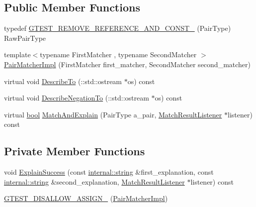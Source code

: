 \subsection*{Public Member Functions}
\begin{DoxyCompactItemize}
\item 
typedef \hyperlink{classtesting_1_1internal_1_1PairMatcherImpl_aa035224a7b73b2af1d1d27226a479241}{G\+T\+E\+S\+T\+\_\+\+R\+E\+M\+O\+V\+E\+\_\+\+R\+E\+F\+E\+R\+E\+N\+C\+E\+\_\+\+A\+N\+D\+\_\+\+C\+O\+N\+S\+T\+\_\+} (Pair\+Type) Raw\+Pair\+Type
\item 
{\footnotesize template$<$typename First\+Matcher , typename Second\+Matcher $>$ }\\\hyperlink{classtesting_1_1internal_1_1PairMatcherImpl_ae2615e785df46255c8695a5972ca510a}{Pair\+Matcher\+Impl} (First\+Matcher first\+\_\+matcher, Second\+Matcher second\+\_\+matcher)
\item 
virtual void \hyperlink{classtesting_1_1internal_1_1PairMatcherImpl_ad4b5139aa8a3cdcc178c9d81b98d95f0}{Describe\+To} (\+::std\+::ostream $\ast$os) const
\item 
virtual void \hyperlink{classtesting_1_1internal_1_1PairMatcherImpl_a41ef8b1ae031cf342a380e2f2fb2a526}{Describe\+Negation\+To} (\+::std\+::ostream $\ast$os) const
\item 
virtual \hyperlink{classbool}{bool} \hyperlink{classtesting_1_1internal_1_1PairMatcherImpl_a1bba47f97cbf50a1f6331d3f7bfd47a1}{Match\+And\+Explain} (Pair\+Type a\+\_\+pair, \hyperlink{classtesting_1_1MatchResultListener}{Match\+Result\+Listener} $\ast$listener) const
\end{DoxyCompactItemize}
\subsection*{Private Member Functions}
\begin{DoxyCompactItemize}
\item 
void \hyperlink{classtesting_1_1internal_1_1PairMatcherImpl_ae73fee9c00b8be4b596ad13b8b6eaa09}{Explain\+Success} (const \hyperlink{namespacetesting_1_1internal_a8e8ff5b11e64078831112677156cb111}{internal\+::string} \&first\+\_\+explanation, const \hyperlink{namespacetesting_1_1internal_a8e8ff5b11e64078831112677156cb111}{internal\+::string} \&second\+\_\+explanation, \hyperlink{classtesting_1_1MatchResultListener}{Match\+Result\+Listener} $\ast$listener) const
\item 
\hyperlink{classtesting_1_1internal_1_1PairMatcherImpl_a4c662796fe757a60292da3177cf3152a}{G\+T\+E\+S\+T\+\_\+\+D\+I\+S\+A\+L\+L\+O\+W\+\_\+\+A\+S\+S\+I\+G\+N\+\_\+} (\hyperlink{classtesting_1_1internal_1_1PairMatcherImpl}{Pair\+Matcher\+Impl})
\end{DoxyCompactItemize}

